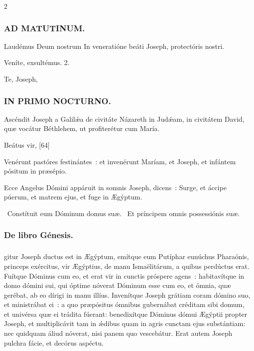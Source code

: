 \documentclass[9pt,twoside]{extarticle}
\begin{document}
\begin{multicols}{2}
{{\subsubsection*{\center \textsc{AD MATUTINUM.}}
\begin{tightlist}{}
\item {} Laudémus Deum nostrum \textred{*} In veneratióne beáti Joseph, protectóris nostri.
\item {} Veníte, exsultémus. 2.
\item {} Te, Joseph, 
\end{tightlist}

\subsubsection*{\center \textsc{IN PRIMO NOCTURNO.}}
\begin{tightlist}{}
\item {} Ascéndit Joseph a Galilǽa de civitáte Názareth in Judǽam, in civitátem David, quæ vocátur Béthlehem, ut profiterétur cum María.
\item {} Beátus vir,  [64]
\item {} Venérunt pastóres festinántes~: et invenérunt Maríam, et Joseph, et infántem pósitum in præsépio.
\item {} Ecce Angelus Dómini appáruit in somnis Joseph, dicens~: Surge, et áccipe púerum, et matrem ejus, et fuge in Ægýptum.
\item {}~Constítuit eum Dóminum domus suæ. ~Et príncipem omnis possessiónis suæ.
\item {}
\end{tightlist}

\subsubsection*{\center De libro Génesis.}
\subsubsection*{\center {}}
gitur Joseph ductus est in Ægýptum, emítque eum Putíphar eunúchus Pharaónis, princeps exércitus, vir Ægýptius, de manu Ismaëlitárum, a quibus perdúctus erat.
Fuítque Dóminus cum eo, et erat vir in cunctis próspere agens~: habitavítque in domo dómini sui,
qui óptime nóverat Dóminum esse cum eo, et ómnia, quæ gerébat, ab eo dírigi in manu illíus.
Invenítque Joseph grátiam coram dómino suo, et ministrábat ei~: a quo præpósitus ómnibus gubernábat créditam sibi domum, et univérsa quæ ei trádita fúerant:
benedixítque Dóminus dómui Ægýptii propter Joseph, et multiplicávit tam in ǽdibus quam in agris cunctam ejus substántiam:
nec quidquam áliud nóverat, nisi panem quo vescebátur. Erat autem Joseph pulchra fácie, et decórus aspéctu.

}}
\end{multicols}
\end{document}
